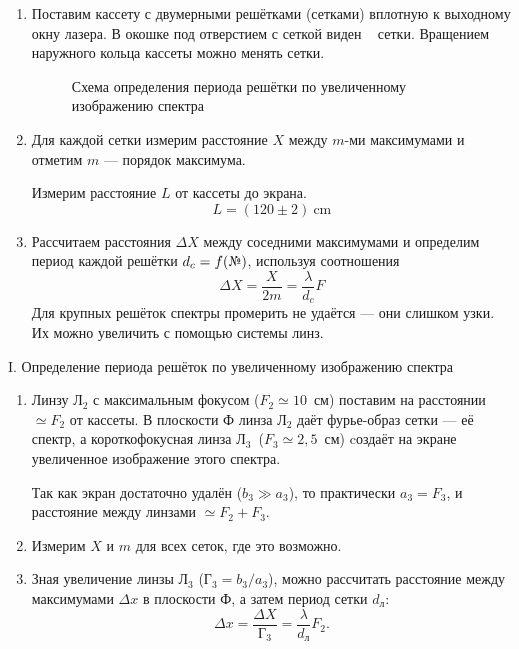 \begin{enumerate}
    \item
    Поставим кассету с двумерными решётками (сетками) вплотную к выходному окну лазера. В окошке под отверстием с сеткой виден \textnumero~ сетки. Вращением наружного кольца кассеты можно менять сетки.
    
    \begin{figure}[h]
    \caption{Схема определения периода решётки по увеличенному изображению спектра}
    \end{figure}
    
    \item
    Для каждой сетки измерим расстояние $X$ между $m$-ми максимумами и отметим $m$ — порядок максимума.
    
    Измерим расстояние $L$ от кассеты до экрана.
    $$ L = (120 \pm 2)~\text{cm}$$
    
    \item 
    Рассчитаем расстояния $\Delta X$ между соседними максимумами и определим период каждой решётки $d_c = f(\text{\textnumero})$, используя соотношения
    $$ \Delta X = \frac{X}{2m} = \frac{\lambda}{d_c}F$$
    Для крупных решёток спектры промерить не удаётся — они слишком узки. Их можно увеличить с помощью системы линз.
\end{enumerate}

\begin{center}
I. Определение периода решёток по увеличенному изображению спектра
\end{center}

\begin{enumerate}
    \item
    Линзу $\text{Л}_2$ с максимальным фокусом ($F_2 \simeq 10$~см) поставим на расстоянии $\simeq F_2$ от кассеты. В плоскости Ф линза $\text{Л}_2$ даёт фурье-образ сетки — её спектр, а короткофокусная линза $\text{Л}_3$~($F_3 \simeq 2,5$~см) cоздаёт на экране увеличенное изображение этого спектра.
    
    Так как экран достаточно удалён ($b_3 \gg a_3$), то практически $a_3 = F_3$, и расстояние между линзами $\simeq F_2 + F_3.$
    
    \item 
    Измерим $X$ и $m$ для всех сеток, где это возможно.
    
    \item
    Зная увеличение линзы $\text{Л}_3$ ($\text{Г}_3 = b_3/a_3$), можно рассчитать расстояние между максимумами $\Delta x$ в плоскости Ф, а затем период сетки $d_{\text{л}}$:
    $$\Delta x = \frac{\Delta X}{\text{Г}_3} = \frac{\lambda}{d_{\text{л}}}F_2.$$   
    
\end{enumerate}

